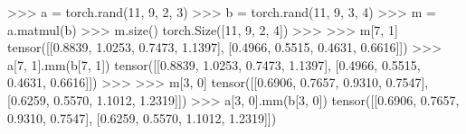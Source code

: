 \documentclass[c,8pt]{beamer}
\begin{document}

\begin{frame}[fragile]

\begin{rawsrc}
>>> a = torch.rand(11, 9, 2, 3)
>>> b = torch.rand(11, 9, 3, 4)
>>> m = a.matmul(b)
>>> m.size()
torch.Size([11, 9, 2, 4])
>>>
>>> m[7, 1]
tensor([[0.8839, 1.0253, 0.7473, 1.1397],
        [0.4966, 0.5515, 0.4631, 0.6616]])
>>> a[7, 1].mm(b[7, 1])
tensor([[0.8839, 1.0253, 0.7473, 1.1397],
        [0.4966, 0.5515, 0.4631, 0.6616]])
>>>
>>> m[3, 0]
tensor([[0.6906, 0.7657, 0.9310, 0.7547],
        [0.6259, 0.5570, 1.1012, 1.2319]])
>>> a[3, 0].mm(b[3, 0])
tensor([[0.6906, 0.7657, 0.9310, 0.7547],
        [0.6259, 0.5570, 1.1012, 1.2319]])
\end{rawsrc}


\end{frame}

\end{document}
